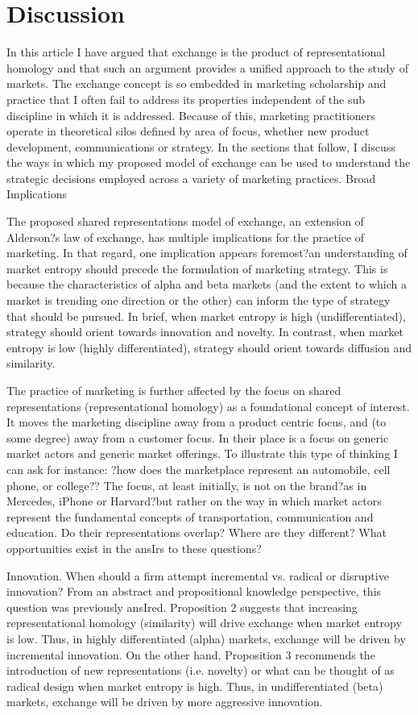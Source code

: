 \section{Discussion}
In this article I have argued that exchange is the product of representational homology and that such an argument provides a unified approach to the study of markets. The exchange concept is so embedded in marketing scholarship and practice that I often fail to address its properties independent of the sub discipline in which it is addressed. Because of this, marketing practitioners operate in theoretical silos defined by area of focus, whether new product development, communications or strategy. In the sections that follow, I discuss the ways in which my proposed model of exchange can be used to understand the strategic decisions employed across a variety of marketing practices.
Broad Implications

The proposed shared representations model of exchange, an extension of Alderson?s law of exchange, has multiple implications for the practice of marketing. In that regard, one implication appears foremost?an understanding of market entropy should precede the formulation of marketing strategy. This is because the characteristics of alpha and beta markets (and the extent to which a market is trending one direction or the other) can inform the type of strategy that should be pursued. In brief, when market entropy is high (undifferentiated), strategy should orient towards innovation and novelty. In contrast, when market entropy is low (highly differentiated), strategy should orient towards diffusion and similarity.  

The practice of marketing is further affected by the focus on shared representations (representational homology) as a foundational concept of interest. It moves the marketing discipline away from a product centric focus, and (to some degree) away from a customer focus. In their place is a focus on generic market actors and generic market offerings. To illustrate this type of thinking I can ask for instance: ?how does the marketplace represent an automobile, cell phone, or college?? The focus, at least initially, is not on the brand?as in Mercedes, iPhone or Harvard?but rather on the way in which market actors represent the fundamental concepts of transportation, communication and education. Do their representations overlap? Where are they different? What opportunities exist in the ansIrs to these questions?     

Innovation. 
When should a firm attempt incremental vs. radical or disruptive innovation? From an abstract and propositional knowledge perspective, this question was previously ansIred. Proposition 2 suggests that increasing representational homology (similarity) will drive exchange when market entropy is low. Thus, in highly differentiated (alpha) markets, exchange will be driven by incremental innovation. On the other hand, Proposition 3 recommends the introduction of new representations (i.e. novelty) or what can be thought of as radical design when market entropy is high. Thus, in undifferentiated (beta) markets, exchange will be driven by more aggressive innovation. 


